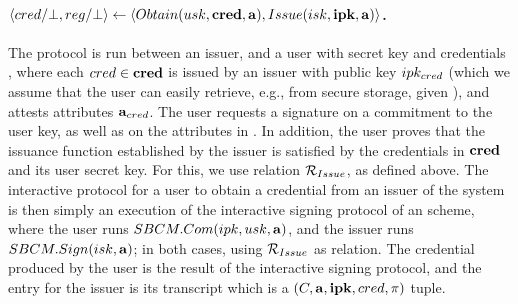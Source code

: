 \paragraph{$\langle cred/\bot,reg/\bot \rangle \gets
  \langle Obtain(usk,\mathbf{cred},\mathbf{a}),Issue(isk,\mathbf{ipk},\mathbf{a})\rangle$.} %
The protocol is run between an issuer, and a user with secret key \usk and
credentials \scred, where each $cred \in \mathbf{cred}$ is issued by an issuer with
public key $ipk_{cred}$ (which we assume that the user can easily retrieve,
e.g., from secure storage, given \cred), and attests attributes
$\mathbf{a}_{cred}$. The user requests a signature on a commitment to the user key,
as well as on the attributes in \attrs. In addition, the user proves that the
issuance function \fissue established by the issuer is satisfied by the
credentials in $\mathbf{cred}$
and its user secret key. For this, we use relation $\mathcal{R}_{Issue}$, as
defined above. The interactive protocol for a user to obtain a credential from
an issuer of the system is then simply an execution of the interactive signing
protocol of an \SBCM scheme, where the user runs $SBCM.Com(ipk,usk,\mathbf{a})$,
and the issuer runs $SBCM.Sign(isk,\mathbf{a})$; in both cases, using
$\mathcal{R}_{Issue}$ as \NIZK relation. The credential \cred produced by the user
is the result of the interactive signing protocol, and the \utrans entry for
the issuer is its transcript which is a $(C,\mathbf{a},\mathbf{ipk},cred,\pi)$ tuple.

\iffalse
\begin{itemize}
\item \uline{User}: Commit to the user secret key with $\Ccom \gets
  \CCommit(\usk)$. Compute proof $\NIZKproof \gets
  \NIZKProve^{\NIZKRel_{\Issue}}(\NIZKcrs_{\Issue},(\usk,\scred,\attrs_{\scred}),
  (\Ccom,\attrs,\sipk_{\scred}))$. Send $(\Ccom,\NIZKproof)$ to Issuer.
\item \uline{Issuer}: Verify \NIZKproof with $\NIZKVerify^{\NIZKRel_{\Issue}}
  (\NIZKcrs_{\Issue},\NIZKproof,(\Ccom,\attrs,\sipk))$, and abort if it fails. Then,
  compute the credential by running $\cred \gets \SBCMSign(\SBCMsk,\Ccom,
  \attrs)$. Send \cred to User. Output $\utrans \gets (\Ccom,\attrs,\sipk,
  \cred,\NIZKproof)$.
\item \uline{User}: Verify the credential with $\SBCMVerify(\SBCMvk,\cred,
  \attrs \cup \lbrace \usk \rbrace)$. Reject if verification fails.
  Otherwise, return \cred.
\end{itemize}
\fi

